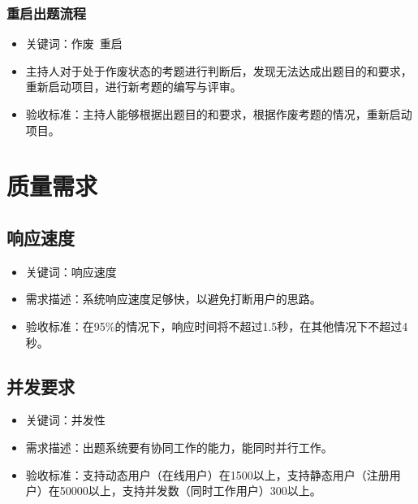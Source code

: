 \documentclass[hyperref, a4paper]{ctexart}
\providecommand{\tightlist}{%
  \setlength{\itemsep}{0pt}\setlength{\parskip}{0pt}}
\begin{document}
\hypertarget{ux91cdux542fux51faux9898ux6d41ux7a0b}{%
\subsubsection{重启出题流程}\label{ux91cdux542fux51faux9898ux6d41ux7a0b}}

\begin{itemize}
\item
  关键词：作废~重启
\item
  主持人对于处于作废状态的考题进行判断后，发现无法达成出题目的和要求，重新启动项目，进行新考题的编写与评审。
\item
  验收标准：主持人能够根据出题目的和要求，根据作废考题的情况，重新启动项目。
\end{itemize}

\hypertarget{ux8d28ux91cfux9700ux6c42}{%
\section{质量需求}\label{ux8d28ux91cfux9700ux6c42}}

\hypertarget{ux54cdux5e94ux901fux5ea6}{%
\subsection{响应速度}\label{ux54cdux5e94ux901fux5ea6}}

\begin{itemize}
\tightlist
\item
  关键词：响应速度
\item
  需求描述：系统响应速度足够快，以避免打断用户的思路。
\item
  验收标准：在95\%的情况下，响应时间将不超过1.5秒，在其他情况下不超过4秒。
\end{itemize}

\hypertarget{ux5e76ux53d1ux8981ux6c42}{%
\subsection{并发要求}\label{ux5e76ux53d1ux8981ux6c42}}

\begin{itemize}
\tightlist
\item
  关键词：并发性
\item
  需求描述：出题系统要有协同工作的能力，能同时并行工作。
\item
  验收标准：支持动态用户（在线用户）在1500以上，支持静态用户（注册用户）在50000以上，支持并发数（同时工作用户）300以上。
\end{itemize}
\end{document}
